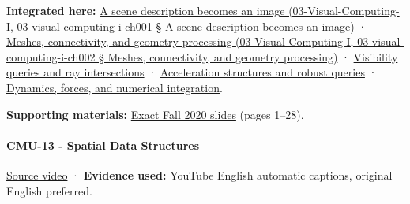 \textbf{Integrated here:} \href{}{A scene description becomes an image (03-Visual-Computing-I, 03-visual-computing-i-ch001 § A scene description becomes an image)} · \href{}{Meshes, connectivity, and geometry processing (03-Visual-Computing-I, 03-visual-computing-i-ch002 § Meshes, connectivity, and geometry processing)} · \hyperref[04-visual-computing-ii-ch028]{Visibility queries and ray intersections} · \hyperref[04-visual-computing-ii-ch029]{Acceleration structures and robust queries} · \hyperref[04-visual-computing-ii-ch029]{Dynamics, forces, and numerical integration}.

\textbf{Supporting materials:} \href{https://15462.courses.cs.cmu.edu/fall2020content/lectures/12_geometricqueries/12_geometricqueries_slides.pdf}{Exact Fall 2020 slides} (pages 1--28).

\paragraph{CMU-13 - Spatial Data Structures}\label{cmu-13---spatial-data-structures}

\href{https://www.youtube.com/watch?v=NF7r-pC8fFc}{Source video} · \textbf{Evidence used:} YouTube English automatic captions, original English preferred.

